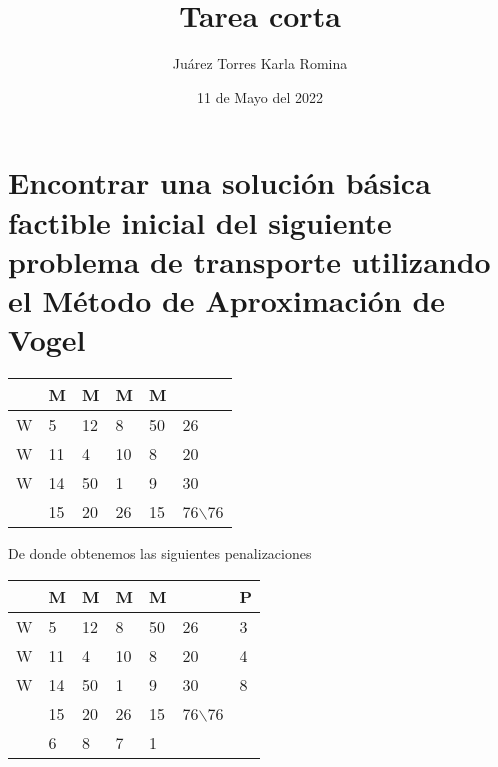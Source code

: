 \documentclass{article}
\title{Tarea corta}
\author{Juárez Torres Karla Romina}
\date{11 de Mayo del 2022}
\begin{document}
\maketitle

\section*{Encontrar una solución básica factible inicial del siguiente problema
de transporte utilizando el Método de Aproximación de Vogel}

\begin{center}
    \begin{tabular}{|l|l|l|l|l|l|}
\hline
\cellcolor[HTML]{67FD9A} & \cellcolor[HTML]{67FD9A}M & \cellcolor[HTML]{67FD9A}M & \cellcolor[HTML]{67FD9A}M & \cellcolor[HTML]{67FD9A}M &  \\ \hline
\cellcolor[HTML]{67FD9A}W & \cellcolor[HTML]{67FD9A}5 & \cellcolor[HTML]{67FD9A}12 & \cellcolor[HTML]{67FD9A}8 & \cellcolor[HTML]{67FD9A}50 & 26 \\ \hline
\cellcolor[HTML]{67FD9A}W & \cellcolor[HTML]{67FD9A}11 & \cellcolor[HTML]{67FD9A}4 & \cellcolor[HTML]{67FD9A}10 & \cellcolor[HTML]{67FD9A}8 & 20 \\ \hline
\cellcolor[HTML]{67FD9A}W & \cellcolor[HTML]{67FD9A}14 & \cellcolor[HTML]{67FD9A}50 & \cellcolor[HTML]{67FD9A}1 & \cellcolor[HTML]{67FD9A}9 & 30 \\ \hline
 & 15 & 20 & 26 & 15 & 76$\backslash$76 \\ \hline
\end{tabular}
\end{center}
De donde obtenemos las siguientes penalizaciones
\begin{center}
\begin{tabular}{|l|l|l|l|l|l|l|}
\hline
 & M & M & M & M &  & P \\ \hline
W & \cellcolor[HTML]{34FF34}5 & \cellcolor[HTML]{34FF34}12 & \cellcolor[HTML]{34FF34}8 & \cellcolor[HTML]{34FF34}50 & 26 & 3 \\ \hline
W & \cellcolor[HTML]{34FF34}11 & \cellcolor[HTML]{34FF34}4 & \cellcolor[HTML]{34FF34}10 & \cellcolor[HTML]{34FF34}8 & 20 & 4 \\ \hline
W & \cellcolor[HTML]{34FF34}14 & \cellcolor[HTML]{34FF34}50 & \cellcolor[HTML]{34FF34}1 & \cellcolor[HTML]{34FF34}9 & 30 & \cellcolor[HTML]{CB0000}8 \\ \hline
 & \cellcolor[HTML]{34FF34}15 & \cellcolor[HTML]{34FF34}20 & \cellcolor[HTML]{34FF34}26 & \cellcolor[HTML]{34FF34}15 & 76$\backslash$76 &  \\ \hline
 & 6 & 8 & 7 & 1 &  &  \\ \hline
\end{tabular}
\end{center}
\end{document}
